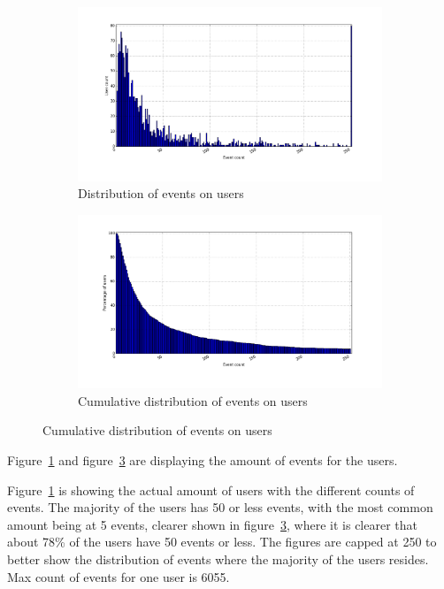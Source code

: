     \begin{figure}[H]
        \centering
        \begin{subfigure}{.5\textwidth}
            \centering
            \includegraphics[width=\dualGraphWidth]{image/user_iddistribution.png}
            \caption{Distribution of events on users}
    \label{figure:userEventDist}
        \end{subfigure}%
        \begin{subfigure}{.5\textwidth}
            \centering
            \includegraphics[width=\dualGraphWidth]{image/user_idcumdistribution.png}
            \caption{Cumulative distribution of events on users}
    \label{figure:userEventCumDist}
        \end{subfigure}
    \end{figure}
        Figure~\ref{figure:userEventDist} and figure~\ref{figure:userEventCumDist} are displaying the amount of events for the users.

        Figure~\ref{figure:userEventDist} is showing the actual amount of users with the different counts of events.
        The majority of the users has 50 or less events, with the most common amount being at 5 events, clearer shown in figure~\ref{figure:userEventCumDist}, where it is clearer that about 78\% of the users have 50 events or less.
        The figures are capped at 250 to better show the distribution of events where the majority of the users resides.
        Max count of events for one user is 6055.

